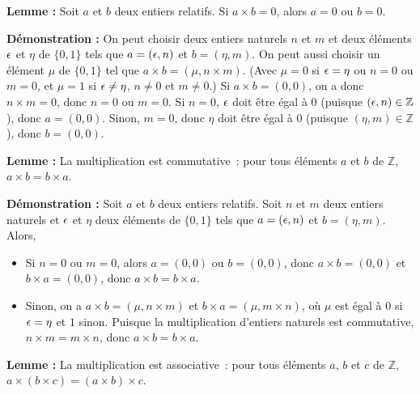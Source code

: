 \medskip

\noindent\textbf{Lemme :} Soit $a$ et $b$ deux entiers relatifs.
    Si $a \times b = 0$, alors $a = 0$ ou $b = 0$.

\medskip

\noindent\textbf{Démonstration :}  
    On peut choisir deux entiers naturels $n$ et $m$ et deux éléments $\epsilon$ et $\eta$ de $\lbrace 0, 1 \rbrace$ tels que $a = (\epsilon, n)$ et $b = (\eta, m)$. 
    On peut aussi choisir un élément $\mu$ de $\lbrace 0, 1 \rbrace$ tel que $a \times b = (\mu, n \times m)$.
    (Avec $\mu = 0$ si $\epsilon = \eta$ ou $n = 0$ ou $m = 0$, et $\mu = 1$ si $\epsilon \neq \eta$, $n \neq 0$ et $m \neq 0$.)
    Si $a \times b = (0,0)$, on a donc $n \times m = 0$, donc $n = 0$ ou $m = 0$.
    Si $n = 0$, $\epsilon$ doit être égal à $0$ (puisque $(\epsilon,n) \in \mathbb{Z}$), donc $a = (0,0)$.
    Sinon, $m = 0$, donc $\eta$ doit être égal à $0$ (puisque $(\eta,m) \in \mathbb{Z}$), donc $b = (0,0)$.

   \done 

\medskip

\noindent\textbf{Lemme :} La multiplication est commutative : pour tous éléments $a$ et $b$ de $\mathbb{Z}$, $a \times b = b \times a$.

\medskip

\noindent\textbf{Démonstration :} Soit $a$ et $b$ deux entiers relatifs. 
    Soit $n$ et $m$ deux entiers naturels et $\epsilon$ et $\eta$ deux éléments de $\lbrace 0, 1 \rbrace$ tels que $a = (\epsilon, n)$ et $b = (\eta, m)$. 
    Alors, 
    \begin{itemize}[nosep]
        \item Si $n = 0$ ou $m = 0$, alors $a=(0,0)$ ou $b=(0,0)$, donc $a \times b = (0,0)$ et $b \times a = (0,0)$, donc $a \times b = b \times a$. 
        \item Sinon, on a $a \times b = (\mu, n \times m)$ et $b \times a = (\mu, m \times n)$, où $\mu$ est égal à $0$ si $\epsilon = \eta$ et $1$ sinon.
            Puisque la multiplication d'entiers naturels est commutative, $n \times m = m \times n$, donc $a \times b = b \times a$.
    \end{itemize}

   \done 

\medskip

\noindent\textbf{Lemme :} La multiplication est associative : pour tous éléments $a$, $b$ et $c$ de $\mathbb{Z}$, $a \times (b \times c) = (a \times b) \times c$.

\medskip

